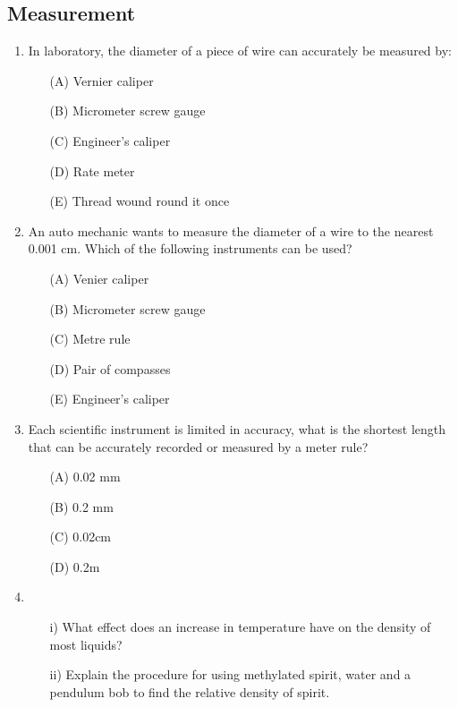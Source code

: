 \subsection{Measurement}

\begin{enumerate}
	\item In laboratory, the diameter of a piece of wire can accurately be measured by:
	\begin{enumerate}[topsep=0ex,itemsep=0ex,partopsep=1ex,parsep=1ex]
		\item[(A)] Vernier caliper
		\item[(B)] Micrometer screw gauge
		\item[(C)] Engineer's caliper
		\item[(D)] Rate meter
		\item[(E)] Thread wound round it once
	\end{enumerate}

	\item An auto mechanic wants to measure the diameter of a wire to the nearest 0.001 cm. Which of the following instruments can be used?
	\begin{enumerate}[topsep=0ex,itemsep=0ex,partopsep=1ex,parsep=1ex]
		\item[(A)] Venier caliper
		\item[(B)] Micrometer screw gauge
		\item[(C)] Metre rule
		\item[(D)] Pair of compasses
		\item[(E)] Engineer's caliper
	\end{enumerate}
	
	\item Each scientific instrument is limited in accuracy, what is the shortest length that can be accurately recorded or measured by a meter rule?
	\begin{enumerate}[topsep=0ex,itemsep=0ex,partopsep=1ex,parsep=1ex]
		\item[(A)] 0.02 mm
		\item[(B)] 0.2 mm
		\item[(C)] 0.02cm
		\item[(D)] 0.2m
	\end{enumerate}
	
	\item 
	\begin{enumerate}[topsep=0ex,itemsep=0ex,partopsep=1ex,parsep=1ex]
		\item[i)] What effect does an increase in temperature have on the density of most liquids?
		\item[ii)] Explain the procedure for using methylated spirit, water and a pendulum bob to find the relative density of spirit.
	\end{enumerate}
	

\end{enumerate}

